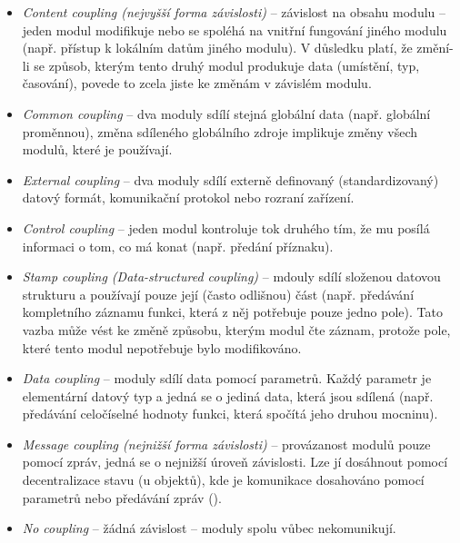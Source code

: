 \begin{itemize}
\item\emph{Content coupling (nejvyšší forma závislosti)} -- závislost na obsahu modulu -- jeden modul modifikuje nebo se spoléhá na vnitřní fungování jiného modulu (např. přístup k lokálním datům jiného modulu). V důsledku platí, že změní-li se způsob, kterým tento druhý modul produkuje data (umístění, typ, časování), povede to zcela jiste ke změnám v závislém modulu.
\item\emph{Common coupling} -- dva moduly sdílí stejná globální data (např. globální proměnnou), změna sdíleného globálního zdroje implikuje změny všech modulů, které je používají.
\item\emph{External coupling} -- dva moduly sdílí externě definovaný (standardizovaný) datový formát, komunikační protokol nebo rozraní zařízení.
\item\emph{Control coupling} -- jeden modul kontroluje tok druhého tím, že mu posílá informaci o tom, co má konat (např. předání  příznaku).
\item\emph{Stamp coupling (Data-structured coupling)} -- mdouly sdílí složenou datovou strukturu a používají pouze její (často odlišnou) část (např. předávání kompletního záznamu funkci, která z něj potřebuje pouze jedno pole). Tato vazba může vést ke změně způsobu, kterým modul čte záznam, protože pole, které tento modul nepotřebuje bylo modifikováno.
\item\emph{Data coupling} -- moduly sdílí data pomocí parametrů. Každý parametr je elementární datový typ a jedná se o jediná data, která jsou sdílená (např. předávání celočíselné hodnoty funkci, která spočítá jeho druhou mocninu).
\item\emph{Message coupling (nejnižší forma závislosti)} -- provázanost modulů pouze pomocí zpráv, jedná se o nejnižší úroveň závislosti. Lze jí dosáhnout pomocí decentralizace stavu (u objektů), kde je komunikace dosahováno pomocí parametrů nebo předávání zpráv ().
\item\emph{No coupling} -- žádná závislost -- moduly spolu vůbec nekomunikují.
\end{itemize}

